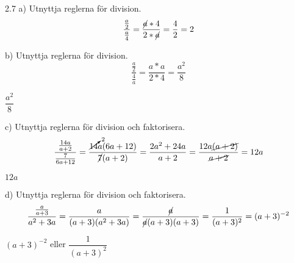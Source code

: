 \begin{task}{2.7 a)}
	Utnyttja reglerna för division.
	\[\dfrac{\frac{a}{2}}{\frac{a}{4}}=
	\dfrac{\cancel{a}*4}{2*\cancel{a}}=
	\dfrac{4}{2}=
	2\]
	
\end{task}

\begin{task}{b)}
	Utnyttja reglerna för division.
	\[\dfrac{\frac{a}{2}}{\frac{4}{a}}=
	\dfrac{a*a}{2*4}=
	\dfrac{a^2}{8}\]
	
	\ans $\dfrac{a^2}{8}$
\end{task}

\begin{task}{c)}
	Utnyttja reglerna för division och faktorisera.
	\[\dfrac{\frac{14a}{a+2}}{\frac{7}{6a+12}}=
	\dfrac{\cancelto{2}{14}a(6a+12)}{\cancel{7}(a+2)}=
	\dfrac{2a^2+24a}{a+2}=\dfrac{12a\cancel{(a+2)}}{\cancel{a+2}}=
	12a\]
	
	\ans $12a$
\end{task}

\begin{task}{d)}
	Utnyttja reglerna för division och faktorisera.
	\[\dfrac{\frac{a}{a+3}}{a^2+3a}=
	\dfrac{a}{(a+3)(a^2+3a)}=
	\dfrac{\cancel{a}}{\cancel{a}(a+3)(a+3)}=
	\dfrac{1}{(a+3)^2}=
	(a+3)^{-2}\]
	
	\ans $(a+3)^{-2}$ eller $\dfrac{1}{(a+3)^2}$
\end{task}